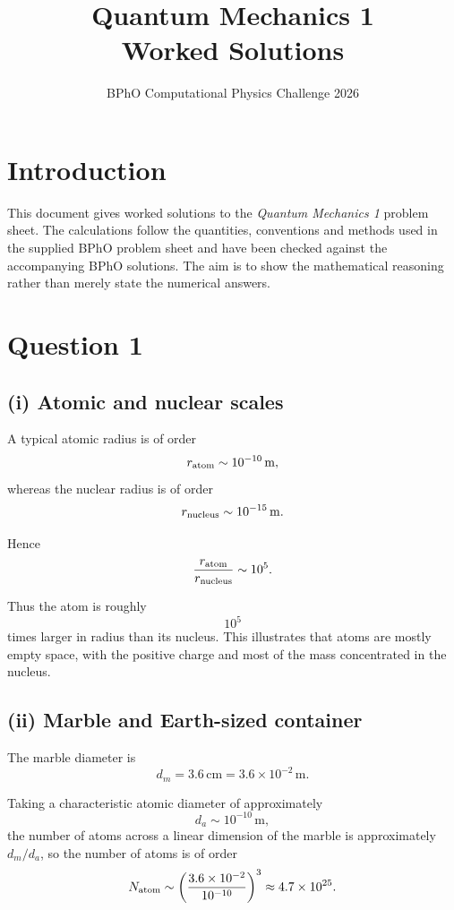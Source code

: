 \documentclass[11pt,a4paper]{article}
\title{\textbf{Quantum Mechanics 1}\\Worked Solutions}
\author{BPhO Computational Physics Challenge 2026}
\date{}
\begin{document}
\maketitle

\section*{Introduction}

This document gives worked solutions to the \emph{Quantum Mechanics 1} problem sheet.
The calculations follow the quantities, conventions and methods used in the supplied
BPhO problem sheet and have been checked against the accompanying BPhO solutions.
The aim is to show the mathematical reasoning rather than merely state the numerical
answers.

\section{Question 1}

\subsection{(i) Atomic and nuclear scales}

A typical atomic radius is of order
\[
r_{\rm atom}\sim10^{-10}\,\mathrm{m},
\]
whereas the nuclear radius is of order
\[
r_{\rm nucleus}\sim10^{-15}\,\mathrm{m}.
\]

Hence
\[
\frac{r_{\rm atom}}{r_{\rm nucleus}}
\sim10^5.
\]

Thus the atom is roughly
\[
\boxed{10^5}
\]
times larger in radius than its nucleus. This illustrates that atoms are mostly empty
space, with the positive charge and most of the mass concentrated in the nucleus.

\subsection{(ii) Marble and Earth-sized container}

The marble diameter is
\[
d_m=3.6\,\mathrm{cm}=3.6\times10^{-2}\,\mathrm{m}.
\]

Taking a characteristic atomic diameter of approximately
\[
d_a\sim10^{-10}\,\mathrm{m},
\]
the number of atoms across a linear dimension of the marble is approximately
\(d_m/d_a\), so the number of atoms is of order
\[
N_{\rm atom}
\sim
\left(\frac{3.6\times10^{-2}}{10^{-10}}\right)^3
\approx4.7\times10^{25}.
\]
\end{document}

